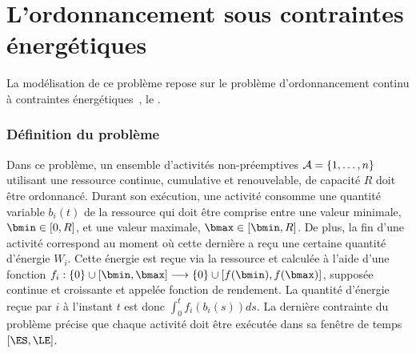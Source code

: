 
\section{L'ordonnancement sous contraintes énergétiques}
 La modélisation de ce problème repose sur le problème 
d'ordonnancement continu à contraintes énergétiques~\cite{ArtiguesLopez}, le
\CECSP. 

\subsubsection{Définition du problème}

Dans ce problème, un ensemble d'activités non-préemptives
${\cal A}=\{1,\dots,n\}$ utilisant une ressource continue, cumulative et
renouvelable, de capacité $R$ doit être ordonnancé. Durant son
exécution, une activité consomme une quantité variable $b_i(t)$ de la
ressource qui doit être comprise entre une valeur minimale, $\bmin \in
[0,R]$, et une valeur maximale, $\bmax \in [\bmin,R]$. De plus, la fin
d'une activité correspond au moment où cette dernière a reçu une
certaine quantité d'énergie $W_i$. Cette énergie est reçue via la
ressource et calculée à l'aide d'une fonction $f_i: \{0\} \cup
[\bmin,\bmax]\longrightarrow\{0\} \cup [f(\bmin),f(\bmax)]$, supposée
continue et croissante et appelée fonction de rendement. La quantité
d'énergie reçue par $i$ à l'instant $t$ est donc $\int_{0}^t
f_i(b_i(s))ds$. La dernière contrainte du problème précise que chaque activité doit
être exécutée dans sa fenêtre de temps $[\ES,\LE]$.

